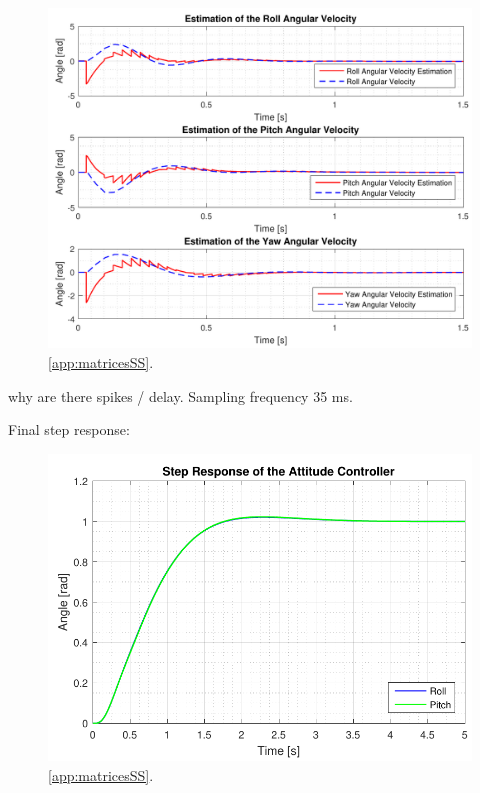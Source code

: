 \begin{figure}[H]
	\centering
	\includegraphics[scale=0.7]{figures/ssObsFinal.pdf}
	\caption{\autoref{app:matricesSS}.}
	\label{fig:ssObsFinal}
\end{figure}

why are there spikes / delay. Sampling frequency 35 ms.

Final step response:

\begin{figure}[H]
	\centering
	\includegraphics[scale=0.8]{figures/ssFinalStep.pdf}
	\caption{\autoref{app:matricesSS}.}
	\label{fig:ssFinalStep}
\end{figure}

